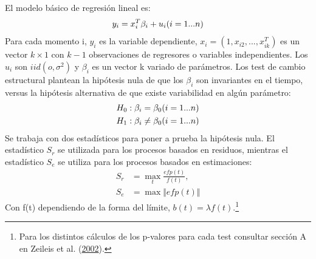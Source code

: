 \documentclass[12pt,oneside]{reedthesis}
\begin{document}
El modelo básico de regresión lineal es:
\begin{equation}
y_i = x_i^T\beta_i + u_i\space\space\space\space (i= 1...n)
\end{equation}
Para cada momento i, \(y_i\) es la variable dependiente, \(x_i = (1, x_{i2}, ..., x_{ik}^T)\) es un vector \(k \times 1\) con \(k-1\) observaciones de regresores o variables independientes. Los \(u_i\) son \(iid(o, \sigma^2)\) y \(\beta_i\) es un vector k variado de parámetros. Los test de cambio estructural plantean la hipótesis nula de que los \(\beta_i\) son invariantes en el tiempo, versus la hipótesis alternativa de que existe variabilidad en algún parámetro:
\begin{align}
H_0:\space\space \beta_i &= \beta_0 \space\space\space\space (i= 1...n) \\
H_1:\space\space \beta_i &\not= \beta_0 \space\space\space\space (i= 1...n)
\end{align}
Se trabaja con dos estadísticos para poner a prueba la hipótesis nula. El estadístico \(S_r\) se utilizada para los procesos basados en residuos, mientras el estadístico \(S_e\) se utiliza para los procesos basados en estimaciones:
\begin{align}
S_r &= \max_t\frac{efp(t)}{f(t)}, \\
S_e &= \max \Vert efp(t) \Vert
\end{align}
Con f(t) dependiendo de la forma del límite, \(b(t) = \lambda f(t)\).\footnote{Para los distintos cálculos de los p-valores para cada test consultar sección A en Zeileis et al. (\protect\hyperlink{ref-Zeileis2002}{2002}).}
\end{document}
